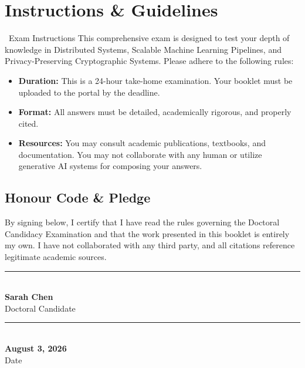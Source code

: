 \section*{Instructions \& Guidelines}

\begin{noticebox}{\faClipboardList\ Exam Instructions}
  This comprehensive exam is designed to test your depth of knowledge in Distributed Systems, Scalable Machine Learning Pipelines, and Privacy-Preserving Cryptographic Systems. Please adhere to the following rules:
  \begin{itemize}
    \item \textbf{Duration:} This is a 24-hour take-home examination. Your booklet must be uploaded to the portal by the deadline.
    \item \textbf{Format:} All answers must be detailed, academically rigorous, and properly cited.
    \item \textbf{Resources:} You may consult academic publications, textbooks, and documentation. You may not collaborate with any human or utilize generative AI systems for composing your answers.
  \end{itemize}
\end{noticebox}

\vspace{1.0cm}

\subsection*{Honour Code \& Pledge}

By signing below, I certify that I have read the rules governing the Doctoral Candidacy Examination and that the work presented in this booklet is entirely my own. I have not collaborated with any third party, and all citations reference legitimate academic sources.

\vspace{1.5cm}

\noindent
\begin{minipage}[t]{0.45\textwidth}
  \rule{\textwidth}{0.5pt}\\
  \textbf{Sarah Chen}\\
  Doctoral Candidate
\end{minipage}
\hfill
\begin{minipage}[t]{0.45\textwidth}
  \rule{\textwidth}{0.5pt}\\
  \textbf{August 3, 2026}\\
  Date
\end{minipage}

